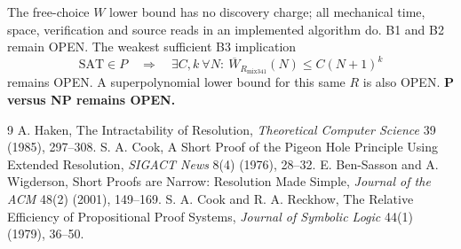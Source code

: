 \documentclass[11pt]{article}
\begin{document}
The free-choice $W$ lower bound has no discovery charge; all mechanical time, space, verification and source reads in an implemented algorithm do. B1 and B2 remain OPEN. The weakest sufficient B3 implication
\[
  \mathrm{SAT}\in P\quad\Longrightarrow\quad
     \exists C,k\ \forall N:\ \overline W_{R_{\mathrm{mix341}}}(N)
       \le C(N+1)^k
\]
remains OPEN. A superpolynomial lower bound for this same $R$ is also OPEN. \textbf{P versus NP remains OPEN.}
\begin{thebibliography}{9}
 A. Haken, The Intractability of Resolution, \emph{Theoretical Computer Science} 39 (1985), 297--308.
 S. A. Cook, A Short Proof of the Pigeon Hole Principle Using Extended Resolution, \emph{SIGACT News} 8(4) (1976), 28--32.
 E. Ben-Sasson and A. Wigderson, Short Proofs are Narrow: Resolution Made Simple, \emph{Journal of the ACM} 48(2) (2001), 149--169.
 S. A. Cook and R. A. Reckhow, The Relative Efficiency of Propositional Proof Systems, \emph{Journal of Symbolic Logic} 44(1) (1979), 36--50.
\end{thebibliography}
\end{document}
